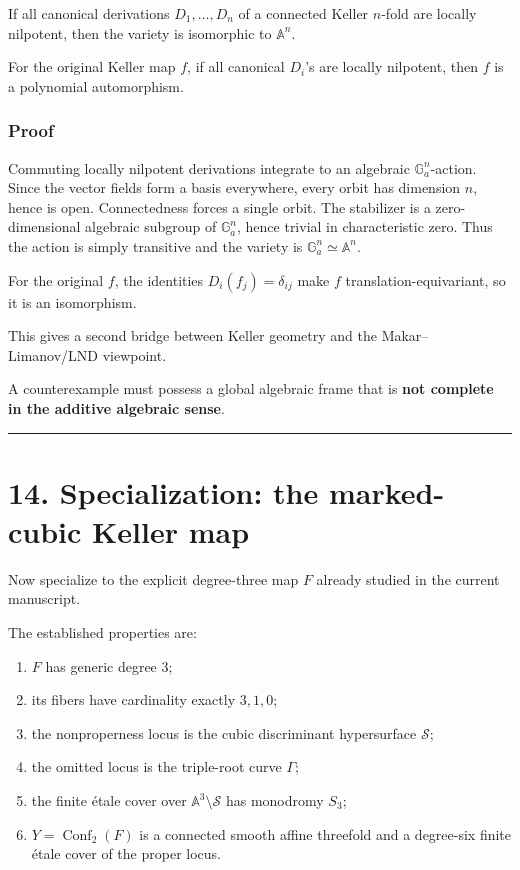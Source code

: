 If all canonical derivations \(D_1,\dots,D_n\) of a connected Keller
\(n\)-fold are locally nilpotent, then the variety is isomorphic to
\(\mathbb A^n\).

For the original Keller map \(f\), if all canonical \(D_i\)'s are
locally nilpotent, then \(f\) is a polynomial automorphism.

\subsubsection{Proof}\label{proof-6}

Commuting locally nilpotent derivations integrate to an algebraic
\(\mathbb G_a^n\)-action. Since the vector fields form a basis
everywhere, every orbit has dimension \(n\), hence is open.
Connectedness forces a single orbit. The stabilizer is a
zero-dimensional algebraic subgroup of \(\mathbb G_a^n\), hence trivial
in characteristic zero. Thus the action is simply transitive and the
variety is \(\mathbb G_a^n\simeq\mathbb A^n\).

For the original \(f\), the identities \(D_i(f_j)=\delta_{ij}\) make
\(f\) translation-equivariant, so it is an isomorphism.

This gives a second bridge between Keller geometry and the
Makar--Limanov/LND viewpoint.

A counterexample must possess a global algebraic frame that is
\textbf{not complete in the additive algebraic sense}.

\begin{center}\rule{0.5\linewidth}{0.5pt}\end{center}

\section{14. Specialization: the marked-cubic Keller
map}\label{specialization-the-marked-cubic-keller-map}

Now specialize to the explicit degree-three map \(F\) already studied in
the current manuscript.

The established properties are:

\begin{enumerate}
\def\labelenumi{\arabic{enumi}.}
\tightlist
\item
  \(F\) has generic degree \(3\);
\item
  its fibers have cardinality exactly \(3,1,0\);
\item
  the nonproperness locus is the cubic discriminant hypersurface
  \(\mathcal S\);
\item
  the omitted locus is the triple-root curve \(\Gamma\);
\item
  the finite étale cover over \(\mathbb A^3\setminus\mathcal S\) has
  monodromy \(S_3\);
\item
  \(Y=\operatorname{Conf}_2(F)\) is a connected smooth affine threefold
  and a degree-six finite étale cover of the proper locus.
\end{enumerate}

